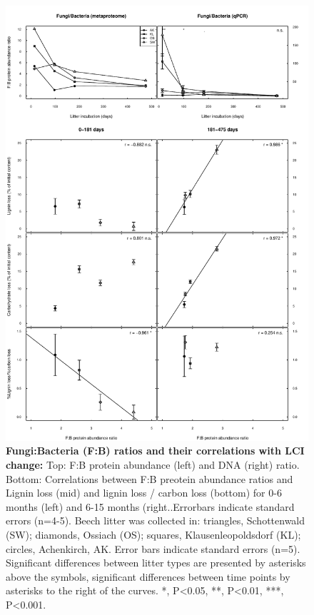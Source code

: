 \documentclass[10pt]{article}
\begin{document}
\begin{flushleft}
\begin{figure}[!ht]
\begin{center}
\includegraphics{ligpaper-f2bnew}
\end{center}
\caption{
{\bf Fungi:Bacteria (F:B) ratios and their correlations with LCI change:} Top: F:B protein abundance (left) and DNA (right) ratio. Bottom: Correlations between F:B preotein abundance ratios and Lignin loss (mid) and lignin loss / carbon loss (bottom) for 0-6 months (left) and 6-15 months (right..Errorbars indicate standard errors (n=4-5).  Beech litter was collected in: triangles, Schottenwald (SW); diamonds, Ossiach (OS); squares, Klausenleopoldsdorf (KL); circles, Achenkirch, AK. Error bars indicate standard errors (n=5). Significant differences between litter types are presented by asterisks above the symbols, significant differences between time points by asterisks to the right of the curves. *, P\textless 0.05, **, P\textless 0.01, ***, P\textless 0.001.}
\label{fig:f2b}
\end{figure}


\end{flushleft}
\end{document}
